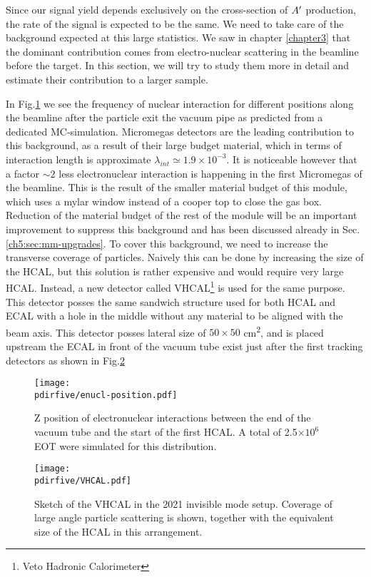 Since our signal yield depends exclusively on the cross-section of $A'$ production, the rate of the signal is expected to be the same. We need to take care of the background expected at this large statistics. We saw in chapter \ref{chapter3} that the dominant contribution comes from electro-nuclear scattering in the beamline before the target. In this section, we will try to study them more in detail and estimate their contribution to a larger sample.

In Fig.\ref{fig:enucl-position} we see the frequency of nuclear interaction for different positions along the beamline after the particle exit the vacuum pipe as predicted from a dedicated MC-simulation. Micromegas detectors are the leading contribution to this background, as a result of their large budget material, which in terms of interaction length is approximate $\lambda_{int} \simeq 1.9 \times 10^{-3}$. It is noticeable however that a factor $\sim 2$ less electronuclear interaction is happening in the first Micromegas of the beamline. This is the result of the smaller material budget of this module, which uses a mylar window instead of a cooper top to close the gas box. Reduction of the material budget of the rest of the module will be an important improvement to suppress this background and has been discussed already in Sec.\ref{ch5:sec:mm-upgrades}. To cover this background, we need to increase the transverse coverage of particles. Naively this can be done by increasing the size of the HCAL, but this solution is rather expensive and would require very large HCAL. Instead, a new detector called VHCAL\footnote{Veto Hadronic Calorimeter} is used for the same purpose. This detector posses the same sandwich structure used for both HCAL and ECAL with a hole in the middle without any material to be aligned with the beam axis. This detector posses lateral size of $50\times50$ \si{\centi\meter\squared}, and is placed upstream the ECAL in front of the vacuum tube exist just after the first tracking detectors as shown in Fig.\ref{fig:vhcal}

\begin{figure}[bth!]
  \centering
  \texttt{[image: \\pdirfive/enucl-position.pdf]}
  \caption[electronuclear interaction position]{Z position of electronuclear interactions between the end of the vacuum tube and the start of the first HCAL. A total of 2.5$\times 10^6$ EOT were simulated for this distribution.}
  \label{fig:enucl-position}
\end{figure}

\begin{figure}[bth!]
  \centering
  \texttt{[image: \\pdirfive/VHCAL.pdf]}
  \caption[Sketch of VHCAL in invisible mode setup 2021]{Sketch of the VHCAL in the 2021 invisible mode setup. Coverage of large angle particle scattering is shown, together with the equivalent size of the HCAL in this arrangement.}
  \label{fig:vhcal}
\end{figure}

